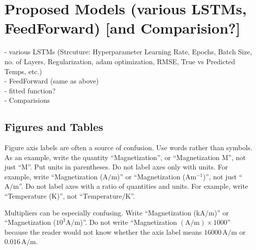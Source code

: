 \documentclass{ifacconf}
\begin{document}

\section{Proposed Models (various LSTMs, FeedForward) [and Comparision?]}
- various LSTMs (Strcuture: Hyperparameter {Learning Rate, Epochs, Batch Size, no. of Layers, Regularization, adam optimization}, RMSE, True vs Predicted Temps, etc.)\\
- FeedForward (same as above)\\
- fitted function?\\
- Comparisions

\subsection{Figures and Tables}

Figure axis labels are often a source of confusion. Use words rather
than symbols. As an example, write the quantity ``Magnetization'', or
``Magnetization M'', not just ``M''. Put units in parentheses. Do not
label axes only with units.  For example, write ``Magnetization
($\mathrm{A}/\mathrm{m}$)'' or ``Magnetization ($\mathrm{A} \mathrm{m}^{-1}$)'', not just
 ``$\mathrm{A}/\mathrm{m}$''. Do not
label axes with a ratio of quantities and units. For example, write
``Temperature ($\mathrm{K}$)'', not ``$\mbox{Temperature}/\mathrm{K}$''.

Multipliers can be especially confusing. Write ``Magnetization
($\mathrm{kA}/\mathrm{m}$)'' or ``Magnetization ($10^3 \mathrm{A}/\mathrm{m}$)''. Do not write
``Magnetization $(\mathrm{A}/\mathrm{m}) \times 1000$'' because the reader would not know
whether the axis label means $16000\,\mathrm{A}/\mathrm{m}$ or $0.016\,\mathrm{A}/\mathrm{m}$.
\end{document}
